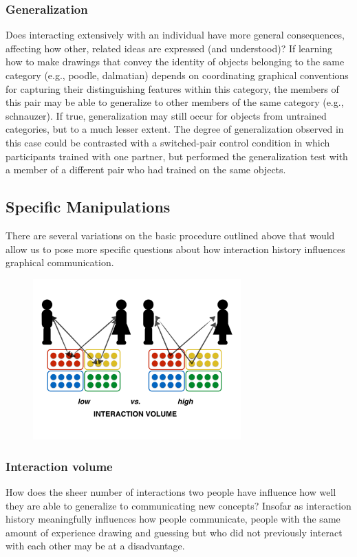 \documentclass[12pt]{article}
\begin{document}
\subsubsection{Generalization}

Does interacting extensively with an individual have more general consequences, affecting how other, related ideas are expressed (and understood)? If learning how to make drawings that convey the identity of objects belonging to the same category (e.g., poodle, dalmatian) depends on coordinating graphical conventions for capturing their distinguishing features within this category, the members of this pair may be able to generalize to other members of the same category (e.g., schnauzer). If true, generalization may still occur for objects from untrained categories, but to a much lesser extent. The degree of generalization observed in this case could be contrasted with a switched-pair control condition in which participants trained with one partner, but performed the generalization test with a member of a different pair who had trained on the same objects. 

\subsection{Specific Manipulations}

There are several variations on the basic procedure outlined above that would allow us to pose more specific questions about how interaction history influences graphical communication.

\begin{figure}[hbtp]
\begin{center}
\includegraphics[width=80mm]{figures/interaction_volume.pdf}
\end{center}
\end{figure}
\vspace{-5mm}

\subsubsection{Interaction volume} How does the sheer number of interactions two people have influence how well they are able to generalize to communicating new concepts? Insofar as interaction history meaningfully influences how people communicate, people with the same amount of experience drawing and guessing but who did not previously interact with each other may be at a disadvantage. 
\end{document}
